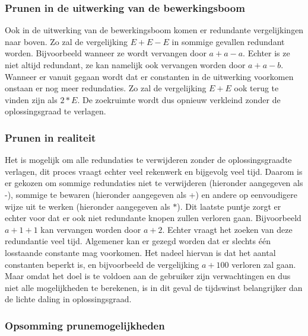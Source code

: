 \documentclass[Main.tex]{subfiles}
\begin{document}
\subsubsection*{Prunen in de uitwerking van de bewerkingsboom}
Ook in de uitwerking van de bewerkingsboom komen er redundante vergelijkingen naar boven. Zo zal de vergelijking $E+E-E$ in sommige gevallen redundant worden. Bijvoorbeeld wanneer ze wordt vervangen door $a+a-a$. Echter is ze niet altijd redundant, ze kan namelijk ook vervangen worden door $a+a-b$. Wanneer er vanuit gegaan wordt dat er constanten in de uitwerking voorkomen onstaan er nog meer redundaties. Zo zal de vergelijking $E+E$ ook terug te vinden zijn als $2*E$. De zoekruimte wordt dus opnieuw verkleind zonder de oplossingsgraad te verlagen.

\subsubsection*{Prunen in realiteit}
Het is mogelijk om alle redundaties te verwijderen zonder de oplossingsgraad\footnotemark[\ref{note:oplossingsgraad}]
te verlagen, dit proces vraagt echter veel rekenwerk en bijgevolg veel tijd. Daarom is er gekozen om sommige redundaties niet te verwijderen (hieronder aangegeven als -), sommige te bewaren (hieronder aangegeven als +) en andere op eenvoudigere wijze uit te werken (hieronder aangegeven als $\ast$). Dit laatste puntje zorgt er echter voor dat er ook niet redundante knopen zullen verloren gaan. Bijvoorbeeld $a+1+1$ kan vervangen worden door $a+2$. Echter vraagt het zoeken van deze redundantie veel tijd. Algemener kan er gezegd worden dat er slechts één losstaande constante mag voorkomen. Het nadeel hiervan is dat het aantal constanten beperkt is, en bijvoorbeeld de vergelijking $a+100$ verloren zal gaan. Maar omdat het doel is te voldoen aan de gebruiker zijn verwachtingen en dus niet alle mogelijkheden te berekenen, is in dit geval de tijdswinst belangrijker dan de lichte daling in oplossingsgraad\footnotemark[\ref{note:oplossingsgraad}].

\subsubsection*{Opsomming prunemogelijkheden}
\end{document}
